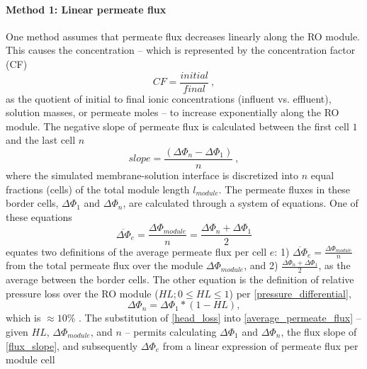 \paragraph{Method 1: Linear permeate flux}
One method assumes that permeate flux decreases linearly along the RO module. This causes the concentration -- which is represented by the concentration factor (CF) \cite{McCaffrey1987TheHalite.,Casas2012SeawaterElectrodialysis,Kartashevsky2015PhosphateEffluents,Yan2017ReverseVelocity,Evangelista1985APlants}
\begin{equation} \label{cf_definition}
    CF = \frac{initial}{final}~,
\end{equation}
as the quotient of initial to final ionic concentrations (influent vs. effluent), solution masses, or permeate moles \cite{Casas2012SeawaterElectrodialysis,Yan2017ReverseVelocity} -- to increase exponentially along the RO module. The negative slope of permeate flux is calculated between the first cell $1$ and the last cell $n$
\begin{equation} \label{flux_slope}
    slope = \frac{(\Delta \Phi_{n}-\Delta \Phi_{1})}{n}~,
\end{equation}
where the simulated membrane-solution interface is discretized into $n$ equal fractions (cells) of the total module length $l_{module}$. The permeate fluxes in these border cells, $\Delta \Phi_{1}$ and $\Delta \Phi_{n}$, are calculated through a system of equations. One of these equations
\begin{equation} \label{average_permeate_flux}
     \overbar{\Delta \Phi}_{e} = \frac{\Delta \Phi_{module}}{n} = \frac{\Delta \Phi_{n} + \Delta \Phi_{1}}{2}
\end{equation}
equates two definitions of the average permeate flux per cell $e$: 1) $\overbar{\Delta \Phi}_{e} = \frac{\Delta \Phi_{module}}{n}$ from the total permeate flux over the module $\Delta \Phi_{module}$, and 2) $\frac{\Delta \Phi_{n} + \Delta \Phi_{1}}{2}$, as the average between the border cells. The other equation is the definition of relative pressure loss over the RO module \cite{Srivathsan2014ReverseUnsteadiness,Gu2020ModelingNetworks} ($HL ; 0\le HL\le 1$) per \cref{pressure_differential},
\begin{equation} \label{head_loss}
     \Delta \Phi_{n}= \Delta \Phi_{1}*(1-HL),
\end{equation}
which is $\approx 10\%$ \cite{Fraidenraich2009ReverseExperiment,Evangelista1985APlants,Dandavati1975HollowSystems}. The substitution of \cref{head_loss} into \cref{average_permeate_flux} -- given $HL$, $\Delta \Phi_{module}$, and $n$ -- permits calculating $\Delta \Phi_{1}$ and  $\Delta \Phi_{n}$, the flux slope of \cref{flux_slope}, and subsequently $\Delta \Phi_{e}$ from a linear expression of permeate flux per module cell
